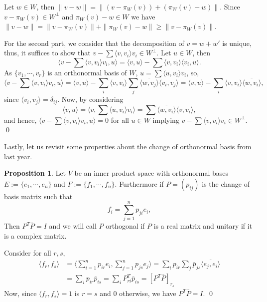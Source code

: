 \documentclass[
]{article}
\theoremstyle{definition}
\newtheorem{prop}{Proposition}[section]
\theoremstyle{definition}
\begin{document}
Let \(w \in W\), then
\(\|v - w\| = \|(v - \pi_W(v)) + (\pi_W(v) - w)\|\). Since
\(v - \pi_W(v) \in W^\bot\) and \(\pi_W(v) - w \in W\) we have
\(\|v - w\| = \|v - \pi_W(v)\| + \|\pi_W(v) - w\| \ge \|v - \pi_W(v)\|\).

For the second part, we consider that the decomposition of
\(v = w + w'\) is unique, thus, it suffices to show that
\(v - \sum \langle v, v_i \rangle v_i \in W^\bot\). Let \(u \in W\),
then \[\langle v - \sum \langle v, v_i \rangle v_i, u \rangle = 
    \langle v, u \rangle - \sum \langle v, v_i \rangle \langle v_i, u \rangle.\]
As \(\{v_1, \cdots, v_r\}\) is an orthonormal basis of \(W\),
\(u = \sum \langle u, v_i \rangle v_i\), so,
\[\langle v - \sum \langle v, v_i \rangle v_i, u \rangle = 
    \langle v, u \rangle - \sum_i \langle v, v_i \rangle \sum_j 
    \overline{\langle w, v_j \rangle} \langle v_i, v_j \rangle = 
    \langle v, u \rangle - \sum_i \langle v, v_i \rangle \overline{\langle w, 
    v_i \rangle},\] since \(\langle v_i, v_j \rangle = \delta_{ij}\).
Now, by considering
\[\langle v, u \rangle = \langle v, \sum \langle u, v_i \rangle v_i \rangle = 
    \sum \overline{\langle w, v_i \rangle} \langle v, v_i \rangle,\] and
hence, \(\langle v - \sum \langle v, v_i \rangle v_i, u \rangle = 0\)
for all \(u \in W\) implying
\(v - \sum \langle v, v_i \rangle v_i \in W^\bot\). \qed

Lastly, let us revisit some properties about the change of orthonormal
basis from last year.

\begin{prop}
  Let \(V\) be an inner product space with orthonormal bases 
  \(E := \{e_1, \cdots, e_n\}\) and \(F := \{f_1, \cdots, f_n\}\). Furthermore 
  if \(P = (p_{ij})\) is the change of basis matrix such that 
  \[f_i = \sum_{j = 1}^n p_{ji}e_i,\]
  Then \(P^T \bar{P} = I\) and we will call \(P\) orthogonal if \(P\) is a real 
  matrix and unitary if it is a complex matrix.
\end{prop}
\proof

Consider for all \(r, s\), \begin{align*}
    \langle f_r, f_s \rangle & = \langle \sum_{i = 1}^n p_{ir}e_i, 
      \sum_{j = 1}^n p_{js}e_j \rangle
      = \sum_i p_{ir} \sum_j \bar{p}_{js} \overline{\langle e_j, e_i \rangle}\\
    & = \sum_i p_{ir} \bar{p}_{is} = \sum_i P^T_{ri} \bar{p}_{is} = [P^T \bar{P}]_{r_s}
  \end{align*} Now, since \(\langle f_r, f_s \rangle = 1\) is \(r = s\)
and 0 otherwise, we have \(P^T \bar{P} = I\). \qed
\end{document}
